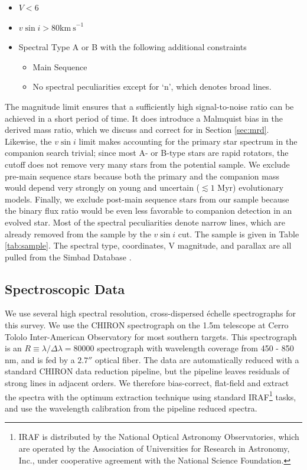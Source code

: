 \documentclass{emulateapj}
\begin{document}
\begin{itemize}
\item $V < 6$
\item $v\sin{i} > 80 \mathrm{km\ s}^{-1}$
\item Spectral Type A or B with the following additional constraints
\begin{itemize}
  \item Main Sequence
  \item No spectral peculiarities except for `n', which denotes broad lines.
\end{itemize}
\end{itemize}

The magnitude limit ensures that a sufficiently high signal-to-noise ratio can be achieved in a short period of time. It does introduce a Malmquist bias in the derived mass ratio, which we discuss and correct for in Section \ref{sec:mrd}. Likewise, the $v\sin{i}$ limit makes accounting for the primary star spectrum in the companion search trivial; since most A- or B-type stars are rapid rotators, the cutoff does not remove very many stars from the potential sample. We exclude pre-main sequence stars because both the primary and the companion mass would depend very strongly on young and uncertain ($\lesssim 1$ Myr) evolutionary models. Finally, we exclude post-main sequence stars from our sample because the binary flux ratio would be even less favorable to companion detection in an evolved star. Most of the spectral peculiarities denote narrow lines, which are already removed from the sample by the $v\sin{i}$ cut. The sample is given in Table \ref{tab:sample}. The spectral type, coordinates, V magnitude, and parallax are all pulled from the Simbad Database \citep{Simbad}.

\subsection{Spectroscopic Data}
\label{subsec:specdata}
We use several high spectral resolution, cross-dispersed \'echelle spectrographs for this survey. We use the CHIRON spectrograph \citep{CHIRON} on the 1.5m telescope at Cerro Tololo Inter-American Observatory for most southern targets. This spectrograph is an $R\equiv \lambda / \Delta \lambda = 80000$ spectrograph with wavelength coverage from 450 - 850 nm, and is fed by a $2.7''$ optical fiber. The data are automatically reduced with a standard CHIRON data reduction pipeline, but the pipeline leaves residuals of strong lines in adjacent orders. We therefore bias-correct, flat-field and extract the spectra with the optimum extraction technique \citep{Horne1986} using standard IRAF\footnote{IRAF is distributed by the National Optical Astronomy Observatories, which are operated by the Association of Universities for Research in Astronomy, Inc., under cooperative agreement with the National Science Foundation.} tasks, and use the wavelength calibration from the pipeline reduced spectra.
\end{document}
